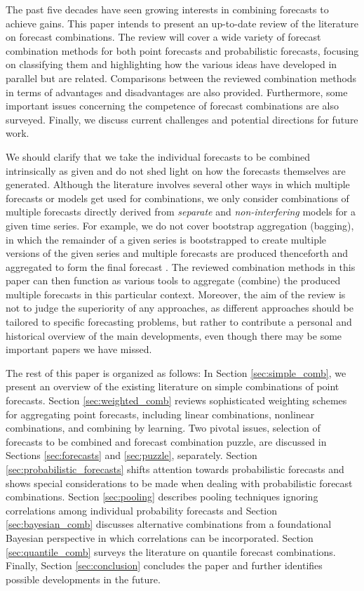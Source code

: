 \documentclass[11pt]{article}
\begin{document}
The past five decades have seen growing interests in combining forecasts to achieve gains. This paper intends to present an up-to-date review of the literature on forecast combinations. The review will cover a wide variety of forecast combination methods for both point forecasts and probabilistic forecasts, focusing on classifying them and highlighting how the various ideas have developed in parallel but are related. Comparisons between the reviewed combination methods in terms of advantages and disadvantages are also provided. Furthermore, some important issues concerning the competence of forecast combinations are also surveyed. Finally, we discuss current challenges and potential directions for future work.

We should clarify that we take the individual forecasts to be combined intrinsically as given and do not shed light on how the forecasts themselves are generated. Although the literature involves several other ways in which multiple forecasts or models get used for combinations, we only consider combinations of multiple forecasts directly derived from \textit{separate} and \textit{non-interfering} models for a given time series. For example, we do not cover bootstrap aggregation (bagging), in which the remainder of a given series is bootstrapped to create multiple versions of the given series and multiple forecasts are produced thenceforth and aggregated to form the final forecast \citep[see, for example,][]{Bergmeir2016-ae,Petropoulos2018-fw}. The reviewed combination methods in this paper can then function as various tools to aggregate (combine) the produced multiple forecasts in this particular context. Moreover, the aim of the review is not to judge the superiority of any approaches, as different approaches should be tailored to specific forecasting problems, but rather to contribute a personal and historical overview of the main developments, even though there may be some important papers we have missed.

The rest of this paper is organized as follows: In Section \ref{sec:simple_comb}, we present an overview of the existing literature on simple combinations of point forecasts. Section \ref{sec:weighted_comb} reviews sophisticated weighting schemes for aggregating point forecasts, including linear combinations, nonlinear combinations, and combining by learning. Two pivotal issues, selection of forecasts to be combined and forecast combination puzzle, are discussed in Sections \ref{sec:forecasts} and \ref{sec:puzzle}, separately. Section \ref{sec:probabilistic_forecasts} shifts attention towards probabilistic forecasts and shows special considerations to be made when dealing with probabilistic forecast combinations. Section \ref{sec:pooling} describes pooling techniques ignoring correlations among individual probability forecasts and Section \ref{sec:bayesian_comb} discusses alternative combinations from a foundational Bayesian perspective in which correlations can be incorporated. Section \ref{sec:quantile_comb} surveys the literature on quantile forecast combinations. Finally, Section \ref{sec:conclusion} concludes the paper and further identifies possible developments in the future.
\end{document}
